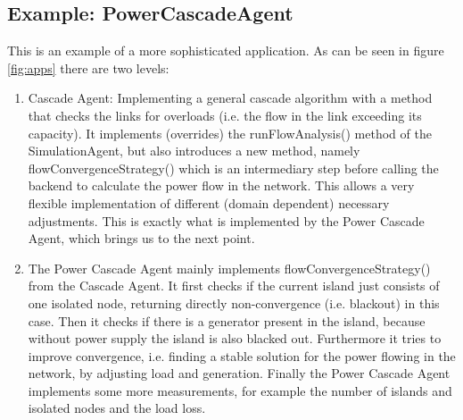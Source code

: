 \documentclass[11pt,fleqn]{book} %
\begin{document}
\subsection{Example: PowerCascadeAgent}
This is an example of a more sophisticated application. As can be seen in figure \ref{fig:apps} there are two levels:
\begin{enumerate}
	\item Cascade Agent: Implementing a general cascade algorithm with a method that checks the links for overloads (i.e. the flow in the link exceeding its capacity). It implements (overrides) the runFlowAnalysis() method of the SimulationAgent, but also introduces a new method, namely flowConvergenceStrategy() which is an intermediary step before calling the backend to calculate the power flow in the network. This allows a very flexible implementation of different (domain dependent) necessary adjustments. This is exactly what is implemented by the Power Cascade Agent, which brings us to the next point.
	\item The Power Cascade Agent mainly implements flowConvergenceStrategy() from the Cascade Agent. It first checks if the current island just consists of one isolated node, returning directly non-convergence (i.e. blackout) in this case. Then it checks if there is a generator present in the island, because without power supply the island is also blacked out. Furthermore it tries to improve convergence, i.e. finding a stable solution for the power flowing in the network, by adjusting load and generation. Finally the Power Cascade Agent implements some more measurements, for example the number of islands and isolated nodes and the load loss.
\end{enumerate}
\end{document}
